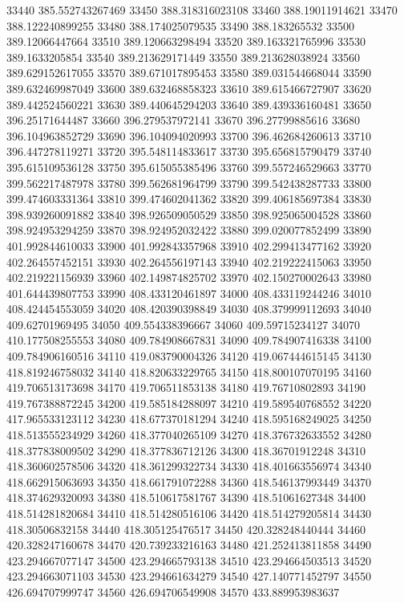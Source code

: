 {33440 385.552743267469
33450 388.318316023108
33460 388.19011914621
33470 388.122240899255
33480 388.174025079535
33490 388.183265532
33500 389.12066447664
33510 389.120663298494
33520 389.163321765996
33530 389.1633205854
33540 389.213629171449
33550 389.213628038924
33560 389.629152617055
33570 389.671017895453
33580 389.031544668044
33590 389.632469987049
33600 389.632468858323
33610 389.615466727907
33620 389.442524560221
33630 389.440645294203
33640 389.439336160481
33650 396.25171644487
33660 396.279537972141
33670 396.27799885616
33680 396.104963852729
33690 396.104094020993
33700 396.462684260613
33710 396.447278119271
33720 395.548114833617
33730 395.656815790479
33740 395.615109536128
33750 395.615055385496
33760 399.557246529663
33770 399.562217487978
33780 399.562681964799
33790 399.542438287733
33800 399.474603331364
33810 399.474602041362
33820 399.406185697384
33830 398.939260091882
33840 398.926509050529
33850 398.925065004528
33860 398.924953294259
33870 398.924952032422
33880 399.020077852499
33890 401.992844610033
33900 401.992843357968
33910 402.299413477162
33920 402.264557452151
33930 402.264556197143
33940 402.219222415063
33950 402.219221156939
33960 402.149874825702
33970 402.150270002643
33980 401.644439807753
33990 408.433120461897
34000 408.433119244246
34010 408.424454553059
34020 408.420390398849
34030 408.379999112693
34040 409.62701969495
34050 409.554338396667
34060 409.59715234127
34070 410.177508255553
34080 409.784908667831
34090 409.784907416338
34100 409.784906160516
34110 419.083790004326
34120 419.067444615145
34130 418.819246758032
34140 418.820633229765
34150 418.800107070195
34160 419.706513173698
34170 419.706511853138
34180 419.76710802893
34190 419.767388872245
34200 419.585184288097
34210 419.589540768552
34220 417.965533123112
34230 418.677370181294
34240 418.595168249025
34250 418.513555234929
34260 418.377040265109
34270 418.376732633552
34280 418.377838009502
34290 418.377836712126
34300 418.36701912248
34310 418.360602578506
34320 418.361299322734
34330 418.401663556974
34340 418.662915063693
34350 418.661791072288
34360 418.546137993449
34370 418.374629320093
34380 418.510617581767
34390 418.51061627348
34400 418.514281820684
34410 418.514280516106
34420 418.514279205814
34430 418.30506832158
34440 418.305125476517
34450 420.328248440444
34460 420.328247160678
34470 420.739233216163
34480 421.252413811858
34490 423.294667077147
34500 423.294665793138
34510 423.294664503513
34520 423.294663071103
34530 423.294661634279
34540 427.140771452797
34550 426.694707999747
34560 426.694706549908
34570 433.889953983637
}
